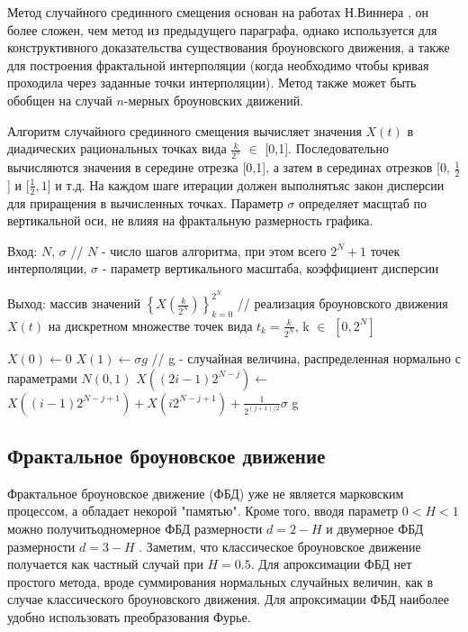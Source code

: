 Метод случайного срединного смещения основан на работах Н.Виннера , он более сложен, чем метод из предыдущего параграфа, однако используется для конструктивного доказательства существования броуновского движения, а также для построения фрактальной интерполяции (когда необходимо чтобы кривая проходила через заданные точки интерполяции). Метод также может быть обобщен на случай $n$-мерных броуновских движений.

Алгоритм случайного срединного смещения вычисляет значения $X(t)$ в диадических рациональных точках вида $\frac{k}{2^n}$ $\in$ [0,1]. Последовательно вычисляются значения в середине отрезка [0,1], а затем в серединах отрезков [0, $\frac{1}{2}$] и [$\frac{1}{2}, 1$] и т.д. На каждом шаге итерации должен выполнятьяс закон дисперсии для приращения в вычисленных точках. Параметр $\sigma$ определяет масщтаб по вертикальной оси, не влияя на фрактальную размерность графика. 

Вход: $N$, 	$\sigma$ // $N$ - число шагов алгоритма, при этом всего $2^N + 1$ точек интерполяции, $\sigma$ - параметр вертикального масштаба, коэффициент дисперсии

Выход: массив значений $\left\{X(\frac{k}{2^N})\right\}_{k=0}^{2^N}$ // реализация броуновского движения $X(t)$ на дискретном множестве точек вида $t_k = \frac{k}{2^N}$, k $\in$ $[0, 2^N]$

\begin{algorithmic}[1]
	\State $X(0)\gets 0$
	\State $X(1)\gets \sigma g$ // g - случайная величина, распределенная нормально с параметрами $N(0,1)$
	\State $X((2i - 1) 2^{N - j})$$\gets$ $X((i - 1)2^{N-j+1}) + X(i2^{N - j + 1}) + \frac{1}{2^{(j+1)/2}}$$\sigma$ g
	\EndFor
	\EndFor
\end{algorithmic}

\subsection{Фрактальное броуновское движение}

Фрактальное броуновское движение (ФБД) уже не является марковским процессом, а обладает некорой "памятью". Кроме того, вводя параметр $0 < H < 1$ можно получитьодномерное ФБД размерности $d = 2 - H$ и двумерное ФБД размерности $d = 3 - H$ .
Заметим, что классическое броуновское движение получается как частный случай при $H = 0.5$. Для апроксимации ФБД нет простого метода, вроде суммирования нормальных случайных величин, как в случае классического броуновского движения. Для апроксимации ФБД наиболее удобно использовать преобразования Фурье.

